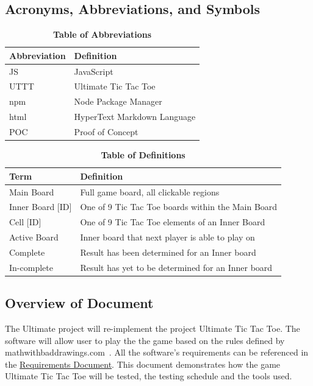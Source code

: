 \documentclass[12pt, titlepage]{article}
\begin{document}
\subsection{Acronyms, Abbreviations, and Symbols}
	
\begin{table}[hbp]
\caption{\textbf{Table of Abbreviations}} \label{Table}

\begin{tabularx}{\textwidth}{p{3cm}X}
\toprule
\textbf{Abbreviation} & \textbf{Definition} \\
\midrule
JS & JavaScript\\
UTTT & Ultimate Tic Tac Toe\\
npm & Node Package Manager\\
html & HyperText Markdown Language\\
POC & Proof of Concept\\
\bottomrule
\end{tabularx}

\end{table}

\begin{table}[!htbp]
\caption{\textbf{Table of Definitions}} \label{Table}

\begin{tabularx}{\textwidth}{p{3cm}X}
\toprule
\textbf{Term} & \textbf{Definition}\\
\midrule
Main Board & Full game board, all clickable regions \\
Inner Board [ID] & One of 9 Tic Tac Toe boards within the Main Board\\
Cell [ID] & One of 9 Tic Tac Toe elements of an Inner Board\\
Active Board & Inner board that next player is able to play on\\
Complete & Result has been determined for an Inner board \\
In-complete & Result has yet to be determined for an Inner board \\
\bottomrule
\end{tabularx}

\end{table}	

\subsection{Overview of Document}

The Ultimate  project will re-implement the project Ultimate Tic Tac Toe. The
software will allow user to play the the game based on the rules defined by
mathwithbaddrawings.com~\citep{Rules}. All the software's requirements can be
referenced in the \href{run:../SRS/SRS.pdf}{Requirements Document}. This document
demonstrates how the game Ultimate Tic Tac Toe will be tested, the testing
schedule and the tools used.
\end{document}
